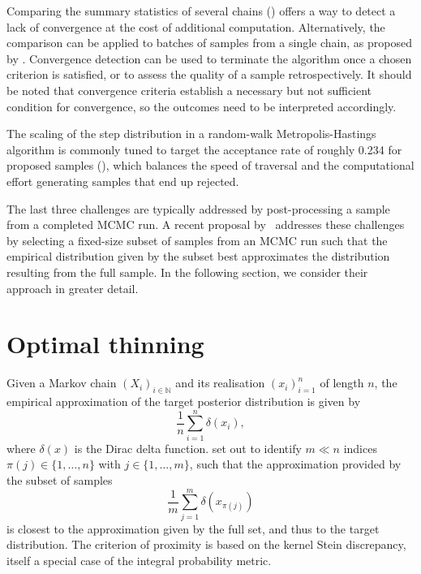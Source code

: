 \documentclass[11pt,a4paper]{report}
\begin{document}
Comparing the summary statistics of several chains (\cite{gelmanInferenceIterativeSimulation1992,brooksGeneralMethodsMonitoring1998,vehtariRankNormalizationFoldingLocalization2021}) offers a way to detect a lack of convergence at the cost of additional computation. Alternatively, the comparison can be applied to batches of samples from a single chain, as proposed by \cite{vatsRevisitingGelmanRubin2021}. Convergence detection can be used to terminate the algorithm once a chosen criterion is satisfied, or to assess the quality of a sample retrospectively. It should be noted that convergence criteria establish a necessary but not sufficient condition for convergence, so the outcomes need to be interpreted accordingly.

The scaling of the step distribution in a random-walk Metropolis-Hastings algorithm is commonly tuned to target the acceptance rate of roughly 0.234 for proposed samples (\cite{gelmanEfficientMetropolisJumping1996,gelmanWeakConvergenceOptimal1997,robertsOptimalScalingVarious2001}), which balances the speed of traversal and the computational effort generating samples that end up rejected.

The last three challenges are typically addressed by post-processing a sample from a completed MCMC run. A recent proposal by~\cite{riabizOptimalThinningMCMC2022} addresses these challenges by selecting a fixed-size subset of samples from an MCMC run such that the empirical distribution given by the subset best approximates the distribution resulting from the full sample. In the following section, we consider their approach in greater detail.


\section{Optimal thinning}

Given a Markov chain $(X_i)_{i \in \mathbb{N}}$ and its realisation $(x_i)_{i=1}^n$ of length $n$, the empirical approximation of the target posterior distribution is given by
\begin{equation}
\frac{1}{n} \sum_{i=1}^n \delta(x_i),
\label{eq:discrete-distribution}
\end{equation}
where $\delta(x)$ is the Dirac delta function.
\cite{riabizOptimalThinningMCMC2022} set out to identify $m \ll n$ indices $\pi(j) \in \{1,\dots, n\}$ with $j\in\{1, \dots, m\}$, such that the approximation provided by the subset of samples
\begin{equation}
\frac{1}{m} \sum_{j=1}^m \delta(x_{\pi(j)})
\label{eq:thinned-sample}
\end{equation}
is closest to the approximation given by the full set, and thus to the target distribution. The criterion of proximity is based on the kernel Stein discrepancy, itself a special case of the integral probability metric.
\end{document}
